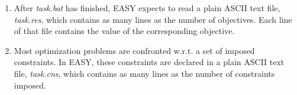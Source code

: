 \begin{enumerate}
\item After \textit{task.bat} has finished, EASY expects to 
read a plain ASCII text file, \textit{task.res}, which 
contains as many lines as the number of objectives. Each line 
of that file contains the value of the corresponding 
objective. 

\item Most optimization problems are confronted w.r.t. 
a set of imposed constraints. In EASY, these constraints 
are declared in a plain ASCII text file, 
\textit{task.cns}, which contains as many
lines as the number of constraints imposed.

\end{enumerate}